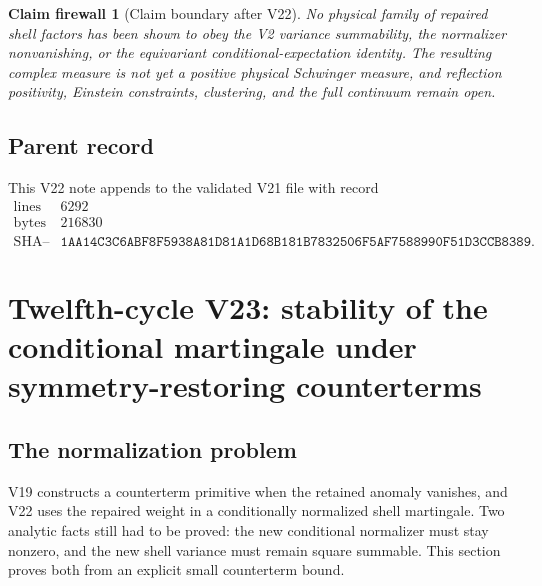 \documentclass[11pt]{article}
\newtheorem{firewall}[theorem]{Claim firewall}
\theoremstyle{remark}
\begin{document}
\begin{firewall}[Claim boundary after V22]
\label{fire:v12v22-claim}
No physical family of repaired shell factors has been shown to obey
the V2 variance summability, the normalizer nonvanishing, or the
equivariant conditional-expectation identity.  The resulting complex
measure is not yet a positive physical Schwinger measure, and
reflection positivity, Einstein constraints, clustering, and the
full continuum remain open.
\end{firewall}

\subsection{Parent record}

This V22 note appends to the validated V21 file with record
\[
\begin{array}{c|c}
\text{lines}&6292\\
\text{bytes}&216830\\
\text{SHA--256}&
\texttt{1AA14C3C6ABF8F5938A81D81A1D68B181B7832506F5AF7588990F51D3CCB8389}.
\end{array}
\]


\section{Twelfth-cycle V23: stability of the conditional martingale
under symmetry-restoring counterterms}
\label{sec:v12v23}

\subsection{The normalization problem}

V19 constructs a counterterm primitive when the retained anomaly
vanishes, and V22 uses the repaired weight in a conditionally
normalized shell martingale.  Two analytic facts still had to be
proved: the new conditional normalizer must stay nonzero, and the
new shell variance must remain square summable.  This section proves
both from an explicit small counterterm bound.
\end{document}
